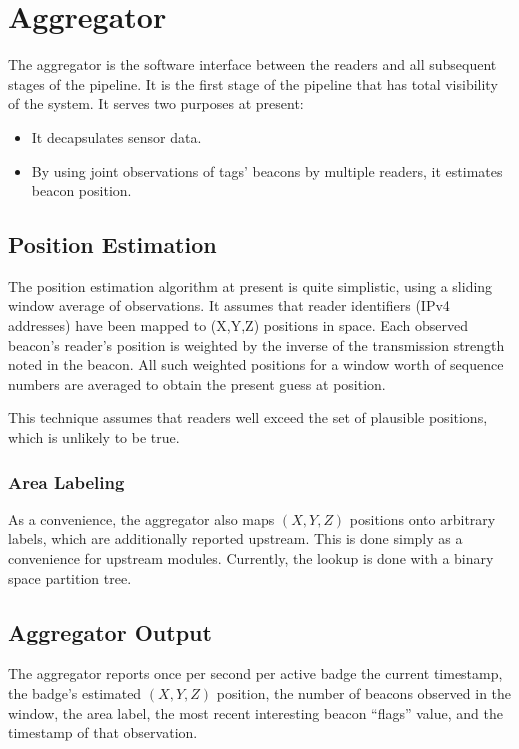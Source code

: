 \chapter{Aggregator}
\label{sec:aggregator}

The aggregator is the software interface
between the readers and all subsequent stages of the pipeline.
It is the first stage of the pipeline
that has total visibility of the system.
It serves two purposes at present:
\begin{itemize}
    \item It decapsulates sensor data.
    \item By using joint observations
        of tags' beacons by multiple readers,
        it estimates beacon position.
\end{itemize}

\section{Position Estimation}

The position estimation algorithm
at present
is quite simplistic,
using a sliding window average
of observations.
It assumes that reader identifiers
(IPv4 addresses)
have been mapped
to (X,Y,Z) positions in space.
Each observed beacon's reader's position
is weighted
by the inverse
of the transmission strength
noted in the beacon.
All such weighted positions
for a window worth of sequence numbers
are averaged to obtain
the present guess at position.

This technique assumes that readers well
exceed the set of plausible positions,
which is unlikely to be true.

\subsection{Area Labeling}

As a convenience,
the aggregator also maps $(X,Y,Z)$ positions
onto arbitrary labels,
which are additionally reported upstream.
This is done simply as a convenience
for upstream modules.
Currently, the lookup is done
with a binary space partition tree.

\section{Aggregator Output}

The aggregator reports
once per second
per active badge
the current timestamp,
the badge's estimated $(X,Y,Z)$ position,
the number of beacons observed in the window,
the area label,
the most recent interesting beacon ``flags'' value,
and the timestamp of that observation.
